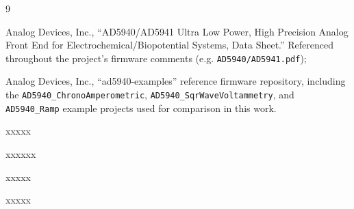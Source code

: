 \documentclass[preprint,12pt]{elsarticle}
\begin{document}
\begin{thebibliography}{9}

Analog Devices, Inc., ``AD5940/AD5941 Ultra Low Power, High Precision Analog Front End for Electrochemical/Biopotential Systems, Data Sheet.'' Referenced throughout the project's firmware comments (e.g. \texttt{AD5940/AD5941.pdf});

Analog Devices, Inc., ``ad5940-examples'' reference firmware repository, including the \texttt{AD5940\_ChronoAmperometric}, \texttt{AD5940\_SqrWaveVoltammetry}, and \texttt{AD5940\_Ramp} example projects used for comparison in this work. 

xxxxx

xxxxxx

xxxxx

xxxxx

\end{thebibliography}
\end{document}

